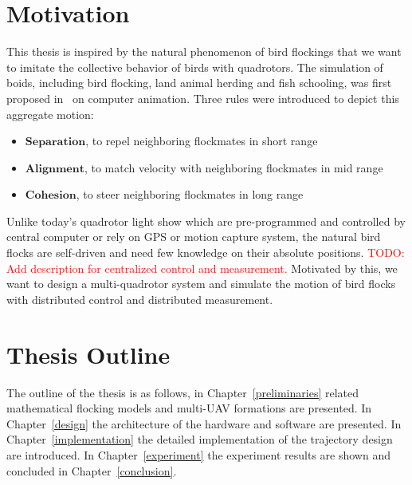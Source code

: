 \section{Motivation}

This thesis is inspired by the natural phenomenon of bird flockings that we want to imitate the collective behavior of birds with quadrotors. The simulation of boids, including bird flocking, land animal herding and fish schooling, was first proposed in~\cite{Reynolds1987} on computer animation. Three rules were introduced to depict this aggregate motion:
\begin{itemize}
  \item $\mathbf{Separation}$, to repel neighboring flockmates in short range
  \item $\mathbf{Alignment}$, to match velocity with neighboring flockmates in mid range
  \item $\mathbf{Cohesion}$, to steer neighboring flockmates in long range
\end{itemize}
Unlike today's quadrotor light show which are pre-programmed and controlled by central computer or rely on GPS or motion capture system, the natural bird flocks are self-driven and need few knowledge on their absolute positions. \textcolor{red}{TODO: Add description for centralized control and measurement.} Motivated by this, we want to design a multi-quadrotor system and simulate the motion of bird flocks with distributed control and distributed measurement.

\section{Thesis Outline}

The outline of the thesis is as follows, in Chapter~\ref{preliminaries} related mathematical flocking models and multi-UAV formations are presented. In Chapter~\ref{design} the architecture of the hardware and software are presented. In Chapter~\ref{implementation} the detailed implementation of the trajectory design are introduced. In Chapter~\ref{experiment} the experiment results are shown and concluded in Chapter~\ref{conclusion}.

\newpage
